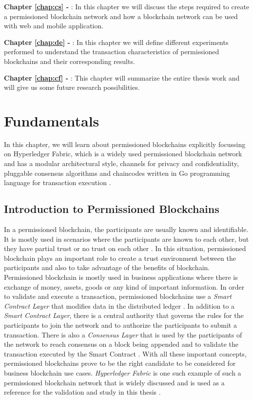 \documentclass[
  a4paper,  %
  twoside,  %
  bibliography=totoc,
  headsepline,
  cleardoublepage=empty,
  parskip=half,
  draft=false
]{scrbook}
\begin{document}
\textbf{Chapter \ref{chap:cs} - } : In this chapter we will discuss the steps required to create a permissioned blockchain network and how a blockchain network can be used with web and mobile application.

\textbf{Chapter \ref{chap:de} - } : In this chapter we will define different experiments performed to understand the transaction characteristics of permissioned blockchains and their corresponding results.

\textbf{Chapter \ref{chap:cf} - } : This chapter will summarize the entire thesis work and will give us some future research possibilities.


\chapter{Fundamentals}
\label{chap:fund}
In this chapter, we will learn about permissioned blockchains explicitly focussing on Hyperledger Fabric, which is a widely used permissioned blockchain network and has a modular architectural style, channels for privacy and confidentiality, pluggable consensus algorithms and chaincodes written in Go programming language for transaction execution \cite{HF}.

\section{Introduction to Permissioned Blockchains }
In a permissioned blockchain, the participants are usually known and identifiable. It is mostly used in scenarios where the participants are known to each other, but they have partial trust or no trust on each other \cite{HF}. In this situation, permissioned blockchain plays an important role to create a trust environment between the participants and also to take advantage of the benefits of blockchain. Permissioned blockchain is mostly used in business applications where there is exchange of money, assets, goods or any kind of important information. In order to validate and execute a transaction, permissioned blockchains use a \textit{Smart Contract Layer} that modifies data in the distributed ledger \cite{HW2}. In addition to a \textit{Smart Contract Layer}, there is a central authority that governs the rules for the participants to join the network and to authorize the participants to submit a transaction. There is also a \textit{Consensus Layer} that is used by the participants of the network to reach consensus on a block being appended and to validate the transaction executed by the Smart Contract \cite{HW1}. With all these important concepts, permissioned blockchains prove to be the right candidate to be considered for business blockchain use cases. \textit{Hyperledger Fabric} is one such example of such a permissioned blockchain network that is widely discussed and is used as a reference for the validation and study in this thesis \cite{HO}.
\end{document}
